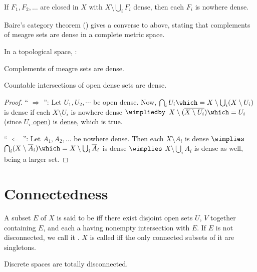 	\begin{lem}
		If $F_1, F_2, \ldots$ are closed in $X$ with $X\setminus\bigcup_i F_i$ dense, then each $F_i$ is nowhere dense.
	\end{lem}
	
	\begin{rmk}
		Baire's category theorem () gives a converse to above, stating that complements of meagre sets are dense in a complete metric space.
	\end{rmk}
	
	\begin{prp}\label{PRP: versions of BCT}
		In a topological space, \tfae:
		\begin{mylist}
			\item\label{PRPi: versions of BCT} Complements of meagre sets are dense.
			\item\label{PRPii: versions of BCT} Countable intersections of open dense sets are dense.
		\end{mylist}
	\end{prp}
	
	\begin{proof}
		`` $\Rightarrow$ '': Let $U_1, U_2, \cdots$ be open dense. Now, $\bigcap_i U_i \which= X\setminus\bigcup_i(X\setminus U_i)$ is dense if each $X\setminus U_i$ is nowhere dense $\wimpliedby$ $X\setminus(\overline{X\setminus U_i})\which= U_i$ (since \uline{$U_i$ open}) is \uline{dense}, which is true.
		
		`` $\Leftarrow$ '': Let $A_1, A_2, \ldots$ be nowhere dense. Then each $X\setminus\overline A_i$ is dense $\wimplies$ $\bigcap_i(X\setminus \overline A_i)\which= X\setminus\bigcup_i\overline A_i$ is dense $\wimplies$ $X\setminus\bigcup_i A_i$ is dense as well, being a larger set.
	\end{proof}
	
	
	
	
\section{Connectedness}\label{SEC: connectedness}

	A subset $E$ of $X$ is said to be  iff there exist disjoint open sets $U$, $V$ together containing $E$, and each a having nonempty intersection with $E$. If $E$ is not disconnected, we call it . $X$ is called  iff the only connected subsets of it are singletons.
	
	\begin{lem}
		Discrete spaces are totally disconnected.
	\end{lem}

